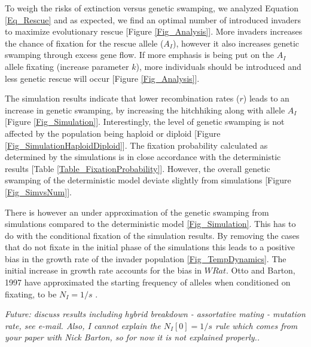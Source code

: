 \documentclass[a4paper,10pt]{article}
\begin{document}
	To weigh the risks of extinction versus genetic swamping, we analyzed Equation \ref{Eq_Rescue} and as expected, we find an optimal number of introduced invaders to maximize evolutionary rescue [Figure \ref{Fig_Analysis}]. More invaders increases the chance of fixation for the rescue allele ($A_I$), however it also increases genetic swamping through excess gene flow. If more emphasis is being put on the $A_I$ allele fixating (increase parameter $k$), more individuals should be introduced and less genetic rescue will occur [Figure \ref{Fig_Analysis}].
	
	The simulation results indicate that lower recombination rates ($r$) leads to an increase in genetic swamping, by increasing the hitchhiking along with allele $A_I$ [Figure \ref{Fig_Simulation}]. Interestingly, the level of genetic swamping is not affected by the population being haploid or diploid [Figure \ref{Fig_SimulationHaploidDiploid}]. The fixation probability calculated as determined by the simulations is in close accordance with the deterministic results [Table \ref{Table_FixationProbability}]. However, the overall genetic swamping of the deterministic model deviate slightly from simulations [Figure \ref{Fig_SimvsNum}].
	
	There is however an under approximation of the genetic swamping from simulations compared to the deterministic model \ref{Fig_Simulation}. This has to do with the conditional fixation of the simulation results. By removing the cases that do not fixate in the initial phase of the simulations this leads to a positive bias in the growth rate of the invader population \ref{Fig_TempDynamics}. The initial increase in growth rate accounts for the bias in $WRat$. Otto and Barton, 1997 have approximated the starting frequency of alleles when conditioned on fixating, to be $N_I = 1/s$ \cite{otto1997evolution}. 
	
	\textit{Future: discuss results including hybrid breakdown - assortative mating - mutation rate, see e-mail. Also, I cannot explain the $N_I[0] = 1/s$ rule which comes from your paper with Nick Barton, so for now it is not explained properly..}
	
	
\end{document}
